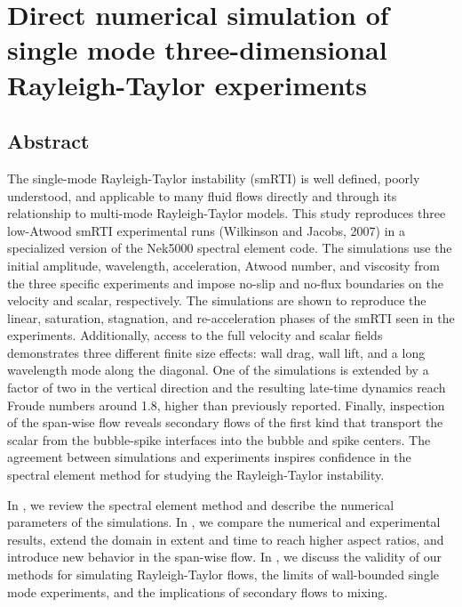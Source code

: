 

\chapter{Direct numerical simulation of single mode three-dimensional Rayleigh-Taylor experiments}

\section{Abstract}
The single-mode Rayleigh-Taylor instability (smRTI) is well defined, poorly understood, and applicable to many fluid flows directly and through its relationship to multi-mode Rayleigh-Taylor models.
This study reproduces three low-Atwood smRTI experimental runs (Wilkinson and Jacobs, 2007) in
a specialized version of the Nek5000 spectral element code.
The simulations use the initial amplitude, wavelength, acceleration, Atwood number, and viscosity from 
the three specific experiments and impose no-slip and no-flux boundaries on the velocity and scalar, respectively.
The simulations are shown to reproduce the linear, saturation, stagnation, and re-acceleration phases of the smRTI
seen in the experiments.
Additionally, access to the full velocity and scalar fields demonstrates three different finite size effects: 
wall drag, wall lift, and a long wavelength mode along the diagonal.
One of the simulations is extended by a factor of two in the vertical direction and the resulting late-time dynamics
reach Froude numbers around 1.8, higher than previously reported.
Finally, inspection of the span-wise flow reveals secondary flows of the first kind that transport the scalar 
from the bubble-spike interfaces into the bubble and spike centers.
The agreement between simulations and experiments inspires confidence in the spectral element method for studying
the Rayleigh-Taylor instability.




In , we review the spectral element method and describe the numerical parameters of the simulations.
In , we compare the numerical and experimental results, extend the domain in extent and time to reach higher aspect ratios, and introduce new behavior in the span-wise flow.
In , we discuss the validity of our methods for simulating Rayleigh-Taylor flows, the limits of wall-bounded single mode experiments, and the implications of secondary flows to mixing.






